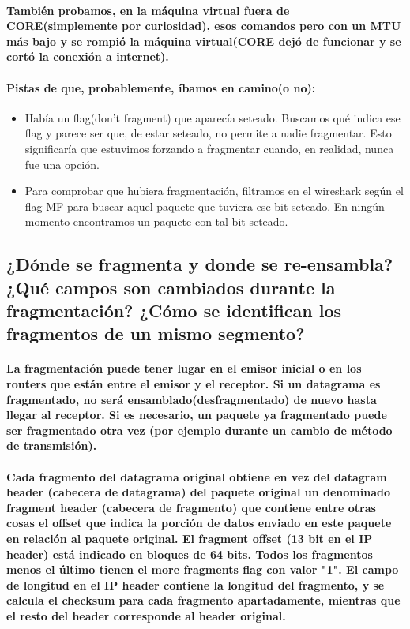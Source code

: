 \documentclass[11pt]{article} %
\begin{document}
        \paragraph{También probamos, en la máquina virtual fuera de CORE(simplemente por curiosidad), esos comandos pero con un MTU más bajo y se rompió la máquina virtual(CORE dejó de funcionar y se cortó la conexión a internet).}
        \paragraph{Pistas de que, probablemente, íbamos en camino(o no):}
        \begin{itemize}
            \item Había un flag(don't fragment) que aparecía seteado. Buscamos qué indica ese flag y parece ser que, de estar seteado, no permite a nadie fragmentar. Esto significaría que estuvimos forzando a fragmentar cuando, en realidad, nunca fue una opción.
            \item Para comprobar que hubiera fragmentación, filtramos en el wireshark según el flag MF para buscar aquel paquete que tuviera ese bit seteado. En ningún momento encontramos un paquete con tal bit seteado.
        \end{itemize}

        \subsection{¿Dónde se fragmenta y donde se re-ensambla? ¿Qué campos son cambiados durante la fragmentación? ¿Cómo se identifican los fragmentos de un mismo segmento?}

        \paragraph{La fragmentación puede tener lugar en el emisor inicial o en los routers que están entre el emisor y el receptor. Si un datagrama es fragmentado, no será ensamblado(desfragmentado) de nuevo hasta llegar al receptor. Si es necesario, un paquete ya fragmentado puede ser fragmentado otra vez (por ejemplo durante un cambio de método de transmisión).}
        \paragraph{Cada fragmento del datagrama original obtiene en vez del datagram header (cabecera de datagrama) del paquete original un denominado fragment header (cabecera de fragmento) que contiene entre otras cosas el offset que indica la porción de datos enviado en este paquete en relación al paquete original. El fragment offset (13 bit en el IP header) está indicado en bloques de 64 bits. Todos los fragmentos menos el último tienen el more fragments flag con valor "1". El campo de longitud en el IP header contiene la longitud del fragmento, y se calcula el checksum para cada fragmento apartadamente, mientras que el resto del header corresponde al header original.}
\end{document}
